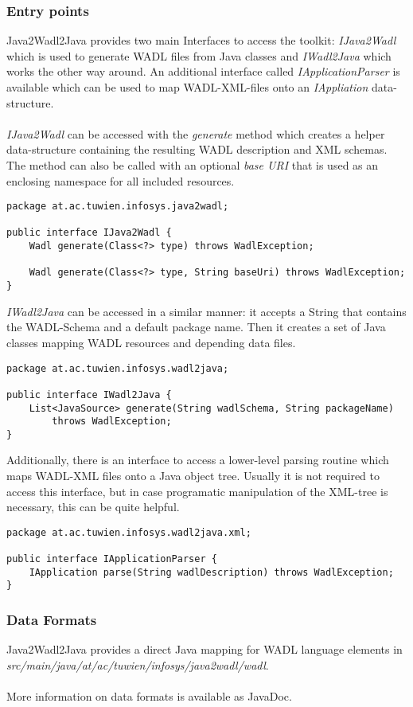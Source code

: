 \subsubsection{Entry points}
Java2Wadl2Java provides two main Interfaces to access the toolkit: \emph{IJava2Wadl} which is used to generate WADL files from Java classes and \emph{IWadl2Java} which works the other way around. An additional interface called \emph{IApplicationParser} is available which can be used to map WADL-XML-files onto an \emph{IAppliation} data-structure. 
\\ \\
\emph{IJava2Wadl} can be accessed with the \emph{generate} method which creates a helper data-structure containing the resulting WADL description and XML schemas. The method can also be called with an optional \emph{base URI} that is used as an enclosing namespace for all included resources.
\begin{lstlisting}
package at.ac.tuwien.infosys.java2wadl;

public interface IJava2Wadl {
	Wadl generate(Class<?> type) throws WadlException;

	Wadl generate(Class<?> type, String baseUri) throws WadlException;
}
\end{lstlisting}
\emph{IWadl2Java} can be accessed in a similar manner: it accepts a String that contains the WADL-Schema and a default package name. Then it creates a set of Java classes mapping WADL resources and depending data files.
\begin{lstlisting}
package at.ac.tuwien.infosys.wadl2java;

public interface IWadl2Java {
	List<JavaSource> generate(String wadlSchema, String packageName) 
		throws WadlException;
}
\end{lstlisting}
Additionally, there is an interface to access a lower-level parsing routine which maps WADL-XML files onto a Java object tree. Usually it is not required to access this interface, but in case programatic manipulation of the XML-tree is necessary, this can be quite helpful.
\begin{lstlisting}
package at.ac.tuwien.infosys.wadl2java.xml;

public interface IApplicationParser {
	IApplication parse(String wadlDescription) throws WadlException;
}
\end{lstlisting}

\subsubsection{Data Formats}
Java2Wadl2Java provides a direct Java mapping for WADL language elements in \emph{src/main/java/at/ac/tuwien/infosys/java2wadl/wadl}. 
\\ \\
More information on data formats is available as JavaDoc.